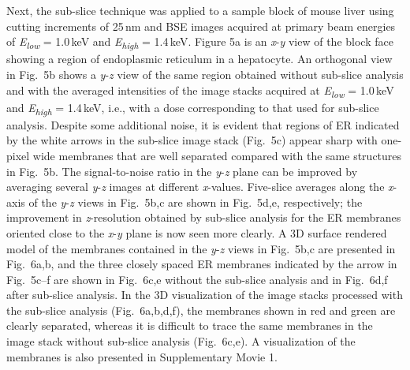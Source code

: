 \documentclass{article}
\begin{document}
Next, the sub-slice technique was applied to a sample block of mouse liver using cutting increments of 25\,nm and BSE images acquired at primary beam energies of \emph{E}\textsubscript{\emph{low}} = 1.0\,keV and \emph{E}\textsubscript{\emph{high}} = 1.4\,keV. Figure 5a is an \emph{x}-\emph{y} view of the block face showing a region of endoplasmic reticulum in a hepatocyte. An orthogonal view in Fig.~5b shows a \emph{y}-\emph{z} view of the same region obtained without sub-slice analysis and with the averaged intensities of the image stacks acquired at \emph{E}\textsubscript{\emph{low}} = 1.0\,keV and \emph{E}\textsubscript{\emph{high}} = 1.4\,keV, i.e., with a dose corresponding to that used for sub-slice analysis. Despite some additional noise, it is evident that regions of ER indicated by the white arrows in the sub-slice image stack (Fig.~5c) appear sharp with one-pixel wide membranes that are well separated compared with the same structures in Fig.~5b. The signal-to-noise ratio in the \emph{y}-\emph{z} plane can be improved by averaging several \emph{y}-\emph{z} images at different \emph{x}-values. Five-slice averages along the \emph{x}-axis of the \emph{y}-\emph{z} views in Fig.~5b,c are shown in Fig.~5d,e, respectively; the improvement in \emph{z}-resolution obtained by sub-slice analysis for the ER membranes oriented close to the \emph{x}-\emph{y} plane is now seen more clearly. A 3D surface rendered model of the membranes contained in the \emph{y}-\emph{z} views in Fig.~5b,c are presented in Fig.~6a,b, and the three closely spaced ER membranes indicated by the arrow in Fig.~5c–f are shown in Fig.~6c,e without the sub-slice analysis and in Fig.~6d,f after sub-slice analysis. In the 3D visualization of the image stacks processed with the sub-slice analysis (Fig.~6a,b,d,f), the membranes shown in red and green are clearly separated, whereas it is difficult to trace the same membranes in the image stack without sub-slice analysis (Fig.~6c,e). A visualization of the membranes is also presented in Supplementary Movie 1.
\end{document}
